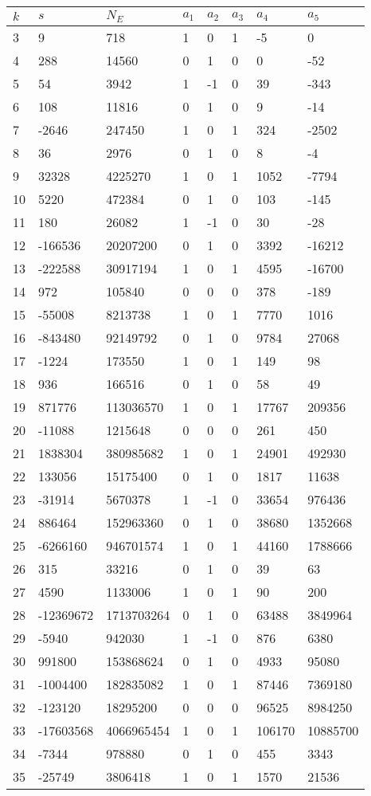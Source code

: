 \documentclass{amsart}
\begin{document}
\begin{longtable}{|l|l|l|lllll|}
\hline
$k$ & $s$ & $N_E$ & $a_1$ & $a_2$ & $a_3$ & $a_4$ & $a_5$\\
\hline
3&9&718&1&0&1&-5&0\\
4&288&14560&0&1&0&0&-52\\
5&54&3942&1&-1&0&39&-343\\
6&108&11816&0&1&0&9&-14\\
7&-2646&247450&1&0&1&324&-2502\\
8&36&2976&0&1&0&8&-4\\
9&32328&4225270&1&0&1&1052&-7794\\
10&5220&472384&0&1&0&103&-145\\
11&180&26082&1&-1&0&30&-28\\
12&-166536&20207200&0&1&0&3392&-16212\\
13&-222588&30917194&1&0&1&4595&-16700\\
14&972&105840&0&0&0&378&-189\\
15&-55008&8213738&1&0&1&7770&1016\\
16&-843480&92149792&0&1&0&9784&27068\\
17&-1224&173550&1&0&1&149&98\\
18&936&166516&0&1&0&58&49\\
19&871776&113036570&1&0&1&17767&209356\\
20&-11088&1215648&0&0&0&261&450\\
21&1838304&380985682&1&0&1&24901&492930\\
22&133056&15175400&0&1&0&1817&11638\\
23&-31914&5670378&1&-1&0&33654&976436\\
24&886464&152963360&0&1&0&38680&1352668\\
25&-6266160&946701574&1&0&1&44160&1788666\\
26&315&33216&0&1&0&39&63\\
27&4590&1133006&1&0&1&90&200\\
28&-12369672&1713703264&0&1&0&63488&3849964\\
29&-5940&942030&1&-1&0&876&6380\\
30&991800&153868624&0&1&0&4933&95080\\
31&-1004400&182835082&1&0&1&87446&7369180\\
32&-123120&18295200&0&0&0&96525&8984250\\
33&-17603568&4066965454&1&0&1&106170&10885700\\
34&-7344&978880&0&1&0&455&3343\\
35&-25749&3806418&1&0&1&1570&21536\\

\end{longtable}
\end{document}
